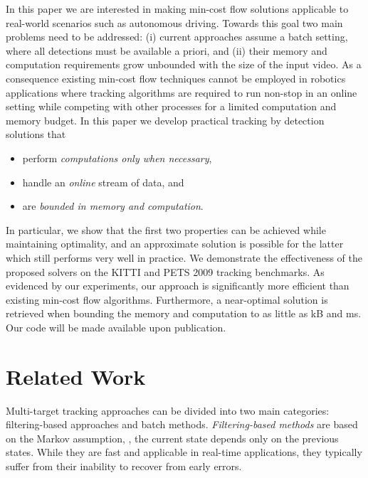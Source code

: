 \documentclass[10pt,twocolumn,letterpaper]{article}
\begin{document}
In this paper we are interested in making min-cost flow solutions applicable to real-world scenarios such as autonomous driving. Towards this goal two main problems need to be addressed:  (i) current approaches assume a batch setting, where all detections must be available a priori, and  (ii) their memory and computation requirements grow unbounded with the size of the input video.
As a consequence existing min-cost flow techniques cannot be  employed in robotics applications where tracking algorithms are required to run non-stop in an online setting while competing with other processes for a limited computation and memory budget. 
In this paper we develop practical tracking by detection solutions that 
\begin{itemize}
\item perform {\it computations only when necessary},
\item handle an  {\it online} stream of data, and
\item are {\it  bounded in memory and computation}.
\end{itemize}
In particular,  we show that the first two properties can be achieved while maintaining  optimality, and an approximate solution is possible for the latter which still performs very well in practice. 
We demonstrate the effectiveness of the proposed solvers on the KITTI \cite{Geiger2012CVPR} and  PETS 2009 \cite{Ferryman2009PETS} tracking benchmarks. As evidenced by our experiments, our approach is significantly more efficient  than existing min-cost flow algorithms. Furthermore, a near-optimal solution is retrieved when bounding the memory and computation to as little as kB and ms. 
Our code will be made available upon publication. \section{Related Work}

Multi-target tracking approaches  can be divided into two main categories: filter\-ing-based approaches and batch methods. 
{\it Filtering-based methods} \cite{Mitzel2012ECCV,Breitenstein2011PAMI,Ess2009PAMI,Nam2014ECCV} are based on the Markov assumption, \ie, the current state depends only on the previous states. 
While they are fast and applicable in real-time applications, they typically suffer from their inability to recover from early errors.
\end{document}

